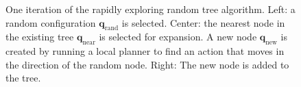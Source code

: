 \begin{figure}
\begin{center}
 \hspace{.5em}
 \hspace{.5em}
\end{center}
\caption{One iteration of the rapidly exploring random tree algorithm.
  Left: a random configuration $\mathbf{q}_{\text{rand}}$ is selected.
  Center: the nearest node in the existing tree
  $\mathbf{q}_{\text{near}}$ is selected for expansion. A new node
  $\mathbf{q}_{\text{new}}$ is created by running a local planner to
  find an action that moves in the direction of the random node.
  Right: The new node is added to the
  tree. }
\label{fig:rrt_iteration}
\end{figure}


